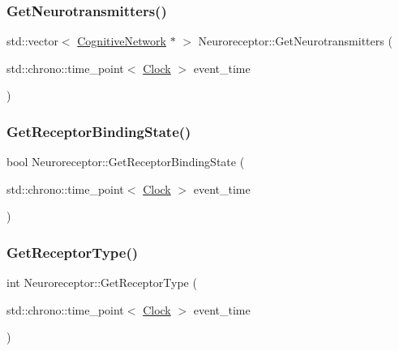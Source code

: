 \mbox{\label{classNeuroreceptor_a4267220ee11105b7628bf39049ef7cc5}} 
\subsubsection{\texorpdfstring{Get\+Neurotransmitters()}{GetNeurotransmitters()}}
{\footnotesize\ttfamily std\+::vector$<$ \mbox{\hyperlink{classCognitiveNetwork}{Cognitive\+Network}} $\ast$ $>$ Neuroreceptor\+::\+Get\+Neurotransmitters (\begin{DoxyParamCaption}\item[{std\+::chrono\+::time\+\_\+point$<$ \mbox{\hyperlink{universe_8h_a0ef8d951d1ca5ab3cfaf7ab4c7a6fd80}{Clock}} $>$}]{event\+\_\+time }\end{DoxyParamCaption})}

\mbox{\label{classNeuroreceptor_afbcf31596170f09292e4d8057c0215e8}} 
\subsubsection{\texorpdfstring{Get\+Receptor\+Binding\+State()}{GetReceptorBindingState()}}
{\footnotesize\ttfamily bool Neuroreceptor\+::\+Get\+Receptor\+Binding\+State (\begin{DoxyParamCaption}\item[{std\+::chrono\+::time\+\_\+point$<$ \mbox{\hyperlink{universe_8h_a0ef8d951d1ca5ab3cfaf7ab4c7a6fd80}{Clock}} $>$}]{event\+\_\+time }\end{DoxyParamCaption})\hspace{0.3cm}{\ttfamily [inline]}}

\mbox{\label{classNeuroreceptor_a3ef0065a7670a2c156e34851140e0fa8}} 
\subsubsection{\texorpdfstring{Get\+Receptor\+Type()}{GetReceptorType()}}
{\footnotesize\ttfamily int Neuroreceptor\+::\+Get\+Receptor\+Type (\begin{DoxyParamCaption}\item[{std\+::chrono\+::time\+\_\+point$<$ \mbox{\hyperlink{universe_8h_a0ef8d951d1ca5ab3cfaf7ab4c7a6fd80}{Clock}} $>$}]{event\+\_\+time }\end{DoxyParamCaption})\hspace{0.3cm}{\ttfamily [inline]}}

